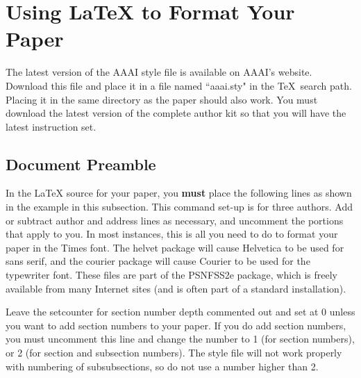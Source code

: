 \documentclass[letterpaper]{article}
\begin{document}
	\section{Using \LaTeX{} to Format Your Paper}
	
	The latest version of the AAAI style file is available on AAAI's website. Download this file and place it in a file named ``aaai.sty" in the \TeX\ search path. Placing it in the same directory as the paper should also work. You must download the latest version of the complete author kit so that you will have the latest instruction set.
	
	\subsection{Document Preamble}
	
	In the \LaTeX{} source for your paper, you \textbf{must} place the following lines as shown in the example in this subsection. This command set-up is for three authors. Add or subtract author and address lines as necessary, and uncomment the portions that apply to you. In most instances, this is all you need to do to format your paper in the Times font. The helvet package will cause Helvetica to be used for sans serif, and the courier package will cause Courier to be used for the typewriter font. These files are part of the PSNFSS2e package, which is freely available from many Internet sites (and is often part of a standard installation).
	
	Leave the setcounter for section number depth commented out and set at 0 unless you want to add section numbers to your paper. If you do add section numbers, you must uncomment this line and change the number to 1 (for section numbers), or 2 (for section and subsection numbers). The style file will not work properly with numbering of subsubsections, so do not use a number higher than 2.
	
\end{document}
